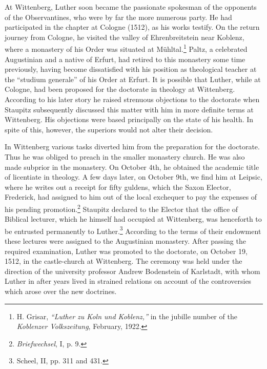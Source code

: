 At Wittenberg, Luther soon became the passionate spokesman of
the opponents of the Observantines, who were by far the more
numerous party. He had participated in the chapter at Cologne
(1512), as his works testify. On the return journey from Cologne,
he visited the valley of Ehrenbreitstein near Koblenz, where a monastery
of his Order was situated at Mühltal.\footnote{
    H. Grisar, \textit{``Luther zu Koln und Koblenz,''} in the
    jubille number of the \textit{Koblenzer Volkszeitung}, February, 1922.}
Paltz, a celebrated
Augustinian and a native of Erfurt, had retired to this monastery
some time previously, having become dissatisfied with his position
as theological teacher at the “studium generale” of his Order at Erfurt.
It is possible that Luther, while at Cologne, had been proposed
for the doctorate in theology at Wittenberg. According to his later
story he raised strenuous objections to the doctorate when Staupitz
subsequently discussed this matter with him in more definite terms
at Wittenberg. His objections were based principally on the state
of his health. In spite of this, however, the superiors would not alter
their decision.

In Wittenberg various tasks diverted him from the preparation for
the doctorate. Thus he was obliged to preach in the smaller monastery
church. He was also made subprior in the monastery. On
October 4th, he obtained the academic title of licentiate in theology.
A few days later, on October 9th, we find him at Leipsic, where
he writes out a receipt for fifty guldens, which the Saxon Elector,
Frederick, had assigned to him out of the local exchequer to pay
the expenses of his pending promotion.\footnote{\textit{Briefwechsel}, I, p. 9.}
Staupitz declared to the
Elector that the office of Biblical lecturer, which he himself had occupied
at Wittenberg, was henceforth to be entrusted permanently
to Luther.\footnote{Scheel, II, pp. 311 and 431.}
According to the terms of their endowment these lectures
were assigned to the Augustinian monastery. After passing the
required examination, Luther was promoted to the doctorate, on
October 19, 1512, in the castle-church at Wittenberg. The ceremony
was held under the direction of the university professor Andrew
Bodenstein of Karlstadt, with whom Luther in after years lived in
strained relations on account of the controversies which arose over
the new doctrines.

